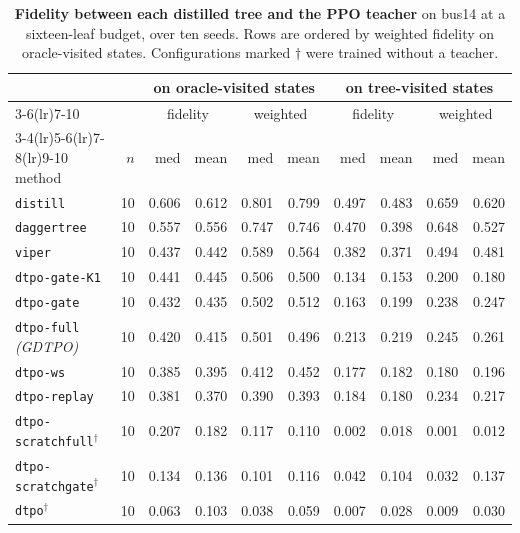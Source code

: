 \begin{table}[H]
\centering
\footnotesize
\setlength{\tabcolsep}{4pt}
\begin{tabular}{lrrrrrrrrr}
\toprule
& & \multicolumn{4}{c}{on oracle-visited states} & \multicolumn{4}{c}{on tree-visited states} \\
\cmidrule(lr){3-6}\cmidrule(lr){7-10}
& & \multicolumn{2}{c}{fidelity} & \multicolumn{2}{c}{weighted} &
    \multicolumn{2}{c}{fidelity} & \multicolumn{2}{c}{weighted} \\
\cmidrule(lr){3-4}\cmidrule(lr){5-6}\cmidrule(lr){7-8}\cmidrule(lr){9-10}
method & $n$ & med & mean & med & mean & med & mean & med & mean \\
\midrule
\texttt{distill} & 10 & 0.606 & 0.612 & 0.801 & 0.799 & 0.497 & 0.483 & 0.659 & 0.620 \\
\texttt{daggertree} & 10 & 0.557 & 0.556 & 0.747 & 0.746 & 0.470 & 0.398 & 0.648 & 0.527 \\
\texttt{viper} & 10 & 0.437 & 0.442 & 0.589 & 0.564 & 0.382 & 0.371 & 0.494 & 0.481 \\
\texttt{dtpo-gate-K1} & 10 & 0.441 & 0.445 & 0.506 & 0.500 & 0.134 & 0.153 & 0.200 & 0.180 \\
\texttt{dtpo-gate} & 10 & 0.432 & 0.435 & 0.502 & 0.512 & 0.163 & 0.199 & 0.238 & 0.247 \\
\texttt{dtpo-full} \emph{(GDTPO)} & 10 & 0.420 & 0.415 & 0.501 & 0.496 & 0.213 & 0.219 & 0.245 & 0.261 \\
\texttt{dtpo-ws} & 10 & 0.385 & 0.395 & 0.412 & 0.452 & 0.177 & 0.182 & 0.180 & 0.196 \\
\texttt{dtpo-replay} & 10 & 0.381 & 0.370 & 0.390 & 0.393 & 0.184 & 0.180 & 0.234 & 0.217 \\
\midrule
\texttt{dtpo-scratchfull}$^{\dagger}$ & 10 & 0.207 & 0.182 & 0.117 & 0.110 & 0.002 & 0.018 & 0.001 & 0.012 \\
\texttt{dtpo-scratchgate}$^{\dagger}$ & 10 & 0.134 & 0.136 & 0.101 & 0.116 & 0.042 & 0.104 & 0.032 & 0.137 \\
\texttt{dtpo}$^{\dagger}$ & 10 & 0.063 & 0.103 & 0.038 & 0.059 & 0.007 & 0.028 & 0.009 & 0.030 \\
\bottomrule
\end{tabular}
\caption[Tree--oracle fidelity on bus14]{%
\textbf{Fidelity between each distilled tree and the PPO teacher} on bus14 at a
sixteen-leaf budget, over ten seeds. Rows are ordered by weighted fidelity on oracle-visited states. Configurations marked $\dagger$ were trained without a teacher.}
\label{tab:fidelity}
\end{table}

